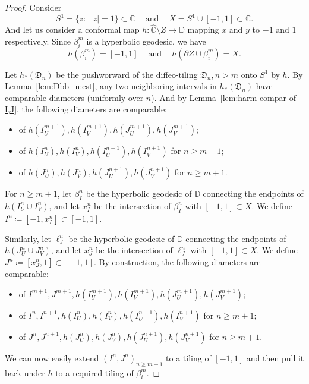 \documentclass{amsart}
\renewcommand{\sp}{{\ \ }}
\newcommand{\1}{{\mathbb 1 }}
\newcommand{\wC}{\widehat{\mathbb{C}}}
\newcommand{\C}{\mathbb{C}}
\newcommand{\Disk}{\mathbb{D}}
\newcommand{\Dbb}{{\mathfrak{D}}}
\theoremstyle{remark}
\numberwithin{equation}{section}
\theoremstyle{definition}
\begin{document}
\begin{proof}
Consider  \[S^1=\{z :\sp |z|=1\}\subset \C\sp\sp \text{ and } \sp\sp X=S^1\cup [-1,1]\subset \C. \]
And let  us consider a conformal map $h\colon \wC\setminus \overline Z\to \Disk$ mapping $x$ and $y$ to $-1$ and $1$ respectively. Since $\beta^m_i$ is a hyperbolic geodesic, we have  \[h(\beta^m_i)=[-1,1]\sp\sp\text{ and }\sp\sp h(\partial Z\cup \beta^m_i)=X.\]


Let $h_*(\Dbb_n)$ be the pushworward of the diffeo-tiling $\Dbb_n, n>m$ onto $S^1$ by $h$. By Lemma~\ref{lem:Dbb_n:est}, any two neighboring intervals in $h_*(\Dbb_n)$ have comparable diameters (uniformly over $n$). And by Lemma~\ref{lem:harm compar of I,J}, the following diameters are comparable:
\begin{itemize}
\item of $ h(I^{m+1}_U),h( I^{m+1}_V), h(J^{m+1}_U),h( J^{m+1}_V)$;
\item of $ h(I^{n}_U),h( I^{n}_V), h(I^{n+1}_U),h( I^{n+1}_V)$ for $n\ge m+1$;
\item of $ h(J^{n}_U),h( J^{n}_V), h(J^{n+1}_U),h( J^{n+1}_V)$ for $n\ge m+1$.
\end{itemize}

For $n\ge m+1$, let $\beta_I^n$ be the hyperbolic geodesic of $\Disk$ connecting the endpoints of $h\left(I^n_{U}\cup I^n_V\right)$, and let $x_I^n$ be the intersection of $\beta_I^n$ with $[-1,1]\subset X$. We define $I^n\coloneqq [-1,x^n_I]\subset [-1,1]$.

Similarly,  let $\ell_J^n$ be the hyperbolic geodesic of $\Disk$ connecting the endpoints of $h\left(J^n_{U}\cup J^n_V\right)$, and let $x_J^n$ be the intersection of $\ell_J^n$ with $[-1,1]\subset X$. We define $J^n\coloneqq [x^n_J,1]\subset [-1,1]$. By construction, the following diameters are comparable:
\begin{itemize}
\item of $ I^{m+1}, J^{m+1} ,h(I^{m+1}_U),h( I^{m+1}_V), h(J^{m+1}_U),h( J^{m+1}_V)$;
\item of $I^n,I^{n+1}, h(I^{n}_U),h( I^{n}_V), h(I^{n+1}_U),h( I^{n+1}_V)$ for $n\ge m+1$;
\item of $ J^n,J^{n+1},h(J^{n}_U),h( J^{n}_V), h(J^{n+1}_U),h( J^{n+1}_V)$ for $n\ge m+1$.
\end{itemize}

We can now easily extend $(I^n,J^n)_{n\ge m+1}$ to a tiling of $[-1,1]$ and then pull it back under $h$ to a required tiling of $\beta^m_i$.
\end{proof}
\end{document}
